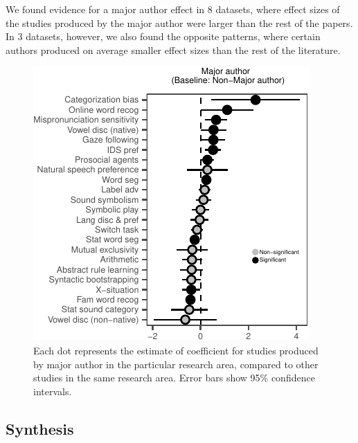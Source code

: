 \documentclass[10pt, letterpaper]{article}
\newenvironment{CodeChunk}{}{}
\begin{document}
We found evidence for a major author effect in 8 datasets, where effect
sizes of the studies produced by the major author were larger than the
rest of the papers. In 3 datasets, however, we also found the opposite
patterns, where certain authors produced on average smaller effect sizes
than the rest of the literature.

\begin{CodeChunk}
\begin{figure}[t!]

{\centering \includegraphics{figs/image-1} 

}

\caption[Each dot represents the estimate of coefficient for studies produced by major author in the particular research area, compared to other studies in the same research area]{Each dot represents the estimate of coefficient for studies produced by major author in the particular research area, compared to other studies in the same research area. Error bars show 95\% confidence intervals. }\label{fig:image}
\end{figure}
\end{CodeChunk}

\hypertarget{synthesis}{%
\subsection{Synthesis}\label{synthesis}}
\end{document}
